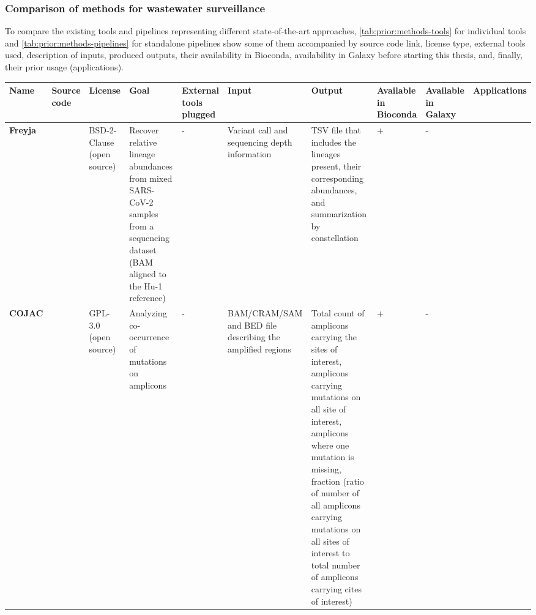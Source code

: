         \subsubsection{Comparison of methods for wastewater surveillance}
        To compare the existing tools and pipelines representing different state-of-the-art approaches, \cref{tab:prior:methods-tools} for individual tools and \cref{tab:prior:methods-pipelines} for standalone pipelines show some of them accompanied by source code link, license type, external tools used, description of inputs, produced outputs, their availability in Bioconda, availability in Galaxy before starting this thesis, and, finally, their prior usage (applications).
        \begin{landscape}
            \centering\vspace*{\fill}
                \begin{table}[ht!]
                \tiny
                \begin{tabular}{l|l|l|l|l|l|l|l|l|l}
\multicolumn{1}{m{1cm}|}{\textbf{Name}}&\multicolumn{1}{m{1cm}|}{\textbf{Source code}}&\multicolumn{1}{m{1cm}|}{\textbf{License}}&\multicolumn{1}{m{3cm}|}{\textbf{Goal}}&\multicolumn{1}{m{3cm}|}{\textbf{External tools plugged}}&\multicolumn{1}{m{3cm}|}{\textbf{Input}}&\multicolumn{1}{m{3cm}|}{\textbf{Output}}&\multicolumn{1}{m{1cm}|}{\textbf{Available in Bioconda}}&\multicolumn{1}{m{1cm}|}{\textbf{Available in Galaxy}}&\multicolumn{1}{m{1cm}}{\textbf{Applications}}\\ \hline 
\multicolumn{1}{m{1cm}|}{\textbf{Freyja}}&\multicolumn{1}{m{1cm}|}{\cite{joshuailevy2022}}&\multicolumn{1}{m{1cm}|}{BSD-2-Clause (open source)}&\multicolumn{1}{m{3cm}|}{Recover relative lineage abundances from mixed SARS-CoV-2 samples from a sequencing dataset (BAM aligned to the Hu-1 reference)}&\multicolumn{1}{m{3cm}|}{-}&\multicolumn{1}{m{3cm}|}{Variant call and sequencing depth information}&\multicolumn{1}{m{3cm}|}{TSV file that includes the lineages present, their corresponding abundances, and summarization by constellation}&\multicolumn{1}{m{1cm}|}{+}&\multicolumn{1}{m{1cm}|}{-}&\multicolumn{1}{m{1cm}}{\cite{karthikeyan2022,solismoreira2022,nutrition2022,karthikeyan2022b}}\\ \hline 
\multicolumn{1}{m{1cm}|}{\textbf{COJAC}}&\multicolumn{1}{m{1cm}|}{\cite{cojac2022}}&\multicolumn{1}{m{1cm}|}{GPL-3.0 (open source)}&\multicolumn{1}{m{3cm}|}{Analyzing co-occurrence of mutations on amplicons}&\multicolumn{1}{m{3cm}|}{-}&\multicolumn{1}{m{3cm}|}{BAM/CRAM/SAM and BED file describing the amplified regions}&\multicolumn{1}{m{3cm}|}{Total count of amplicons carrying the sites of interest, amplicons carrying mutations on all site of interest, amplicons where one mutation is missing, fraction (ratio of number of all amplicons carrying mutations on all sites of interest to total number of amplicons carrying cites of interest) }&\multicolumn{1}{m{1cm}|}{+}&\multicolumn{1}{m{1cm}|}{-}&\multicolumn{1}{m{1cm}}{\cite{jahn2022,jbc,karthikeyan2022b}}\\ \hline 

\end{tabular}
\end{table}
\end{landscape}

